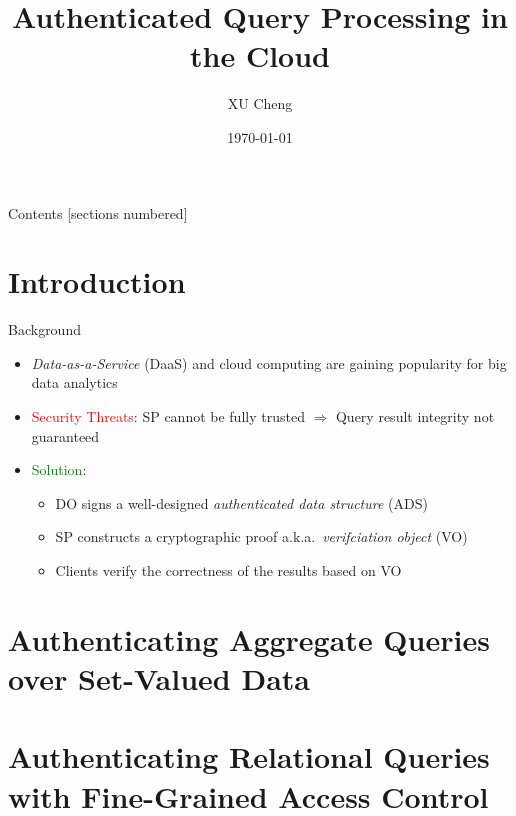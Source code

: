 \documentclass[xcolor={dvipsnames},aspectratio=169,10pt]{beamer}
\title{Authenticated Query Processing in the Cloud}
\author{XU Cheng}
\institute{Supervisor: Prof.~XU Jianliang}
\date{\today}
\begin{document}
\maketitle%

\begin{frame}{Contents}
  [sections numbered]
  \tableofcontents[hideallsubsections]
\end{frame}

\section{Introduction}

\begin{frame}{Background}
  \begin{itemize}[<+->]
    \item \alert{\emph{Data-as-a-Service} (DaaS)} and \alert{cloud computing} are gaining popularity for big data analytics
          \begin{center}
            
          \end{center}
    \item \textcolor{Red}{Security Threats}: SP cannot be fully trusted $\Rightarrow$ Query result integrity not guaranteed
    \item \textcolor{Green}{Solution}:
          \begin{itemize}[<1->]
            \item DO signs a well-designed \alert{\emph{authenticated data structure} (ADS)}
            \item SP constructs a cryptographic proof a.k.a.\ \alert{\emph{verifciation object} (VO)}
            \item Clients verify the correctness of the results based on VO
          \end{itemize}
  \end{itemize}
\end{frame}

\section{Authenticating Aggregate Queries over Set-Valued Data}

\section{Authenticating Relational Queries with Fine-Grained Access Control}
\end{document}
